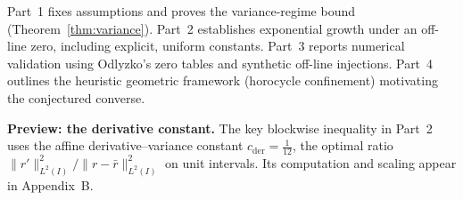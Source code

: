 Part~1 fixes assumptions and proves the variance-regime bound
(Theorem~\ref{thm:variance}).  
Part~2 establishes exponential growth under an off-line zero,
including explicit, uniform constants.
Part~3 reports numerical validation using Odlyzko’s zero tables and synthetic
off-line injections.  
Part~4 outlines the heuristic geometric framework (horocycle confinement)
motivating the conjectured converse.

\medskip
\noindent\textbf{Preview: the derivative constant.}
The key blockwise inequality in Part~2 uses the affine derivative–variance
constant $c_{\mathrm{der}}=\tfrac{1}{12}$, the optimal ratio
$\|r'\|_{L^2(I)}^2/\|r-\bar r\|_{L^2(I)}^2$ on unit intervals.
Its computation and scaling appear in Appendix~B.